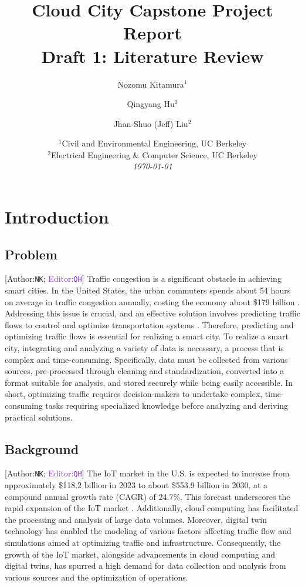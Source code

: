 \documentclass[12pt]{article}
\title{Cloud City Capstone Project Report \\ Draft 1: Literature Review}
\author{Nozomu Kitamura$^1$ \and Qingyang Hu$^2$ \and Jhan-Shuo (Jeff) Liu$^2$}
\date{%
    $^1$Civil and Environmental Engineering, UC Berkeley\\%
    $^2$Electrical Engineering \& Computer Science, UC Berkeley\\[1ex]%
    {\it \today}
}
\begin{document}
\newcommand{\integrity}[2]{[\textcolor{Sepia}{Author:{\tt#1}}; \textcolor{BlueViolet}{Editor:{\tt#2}}]}

\maketitle
\tableofcontents


\newpage
\doublespacing
\section{Introduction}
\subsection{Problem}
\integrity{NK}{QH} Traffic congestion is a significant obstacle in achieving smart cities. In the United States, the urban commuters spends about 54 hours on average in traffic congestion annually, costing the economy about \$179 billion \autocite{brian2019jams}. Addressing this issue is crucial, and an effective solution involves predicting traffic flows to control and optimize transportation systems \autocite{zhu2022research}. Therefore, predicting and optimizing traffic flows is essential for realizing a smart city. To realize a smart city, integrating and analyzing a variety of data is necessary, a process that is complex and time-consuming. Specifically, data must be collected from various sources, pre-processed through cleaning and standardization, converted into a format suitable for analysis, and stored securely while being easily accessible. In short, optimizing traffic requires decision-makers to undertake complex, time-consuming tasks requiring specialized knowledge before analyzing and deriving practical solutions.

\subsection{Background}
\integrity{NK}{QH} The IoT market in the U.S. is expected to increase from approximately \$118.2 billion in 2023 to about \$553.9 billion in 2030, at a compound annual growth rate (CAGR) of 24.7\%. This forecast underscores the rapid expansion of the IoT market \autocite{fortune2020us}. Additionally, cloud computing has facilitated the processing and analysis of large data volumes. Moreover, digital twin technology has enabled the modeling of various factors affecting traffic flow and simulations aimed at optimizing traffic and infrastructure. Consequently, the growth of the IoT market, alongside advancements in cloud computing and digital twins, has spurred a high demand for data collection and analysis from various sources and the optimization of operations.
\end{document}
